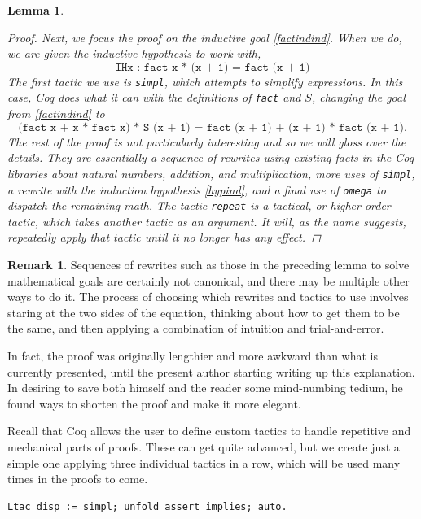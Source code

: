 \documentclass[12pt,notitlepage]{report}
\theoremstyle{plain}
\newtheorem{lem}[theo]{Lemma}
\theoremstyle{definition}
\newtheorem{rem}[theo]{Remark}
\newcommand{\define}[1]{\emph{#1}\index{#1}}
\numberwithin{equation}{section}
\begin{document}
\begin{lem}
\begin{proof}
    \par Next, we focus the proof on the inductive goal \eqref{factindind}.  When we do, we are given the inductive hypothesis to work with,
    \begin{equation}\label{hypind}
\texttt{IHx\ :\ fact\ x * (x + 1) = fact\ (x + 1)}
    \end{equation}
    The first tactic we use is \verb$simpl$, which attempts to simplify expressions.  In this case, Coq does what it can with the definitions of \verb$fact$ and $S$, changing the goal from \eqref{factindind} to
    \begin{equation*}
\texttt{(fact x + x * fact x) * S (x + 1) =
fact (x + 1) + (x + 1) * fact (x + 1)}.
    \end{equation*}
    The rest of the proof is not particularly interesting and so we will gloss over the details.  They are essentially a sequence of rewrites using existing facts in the Coq libraries about natural numbers, addition, and multiplication, more uses of \verb$simpl$, a rewrite with the induction hypothesis \eqref{hypind}, and a final use of \verb$omega$ to dispatch the remaining math.  The tactic \verb$repeat$ is a \define{tactical}, or higher-order tactic, which takes another tactic as an argument.  It will, as the name suggests, repeatedly apply that tactic until it no longer has any effect.
    \end{proof}
\end{lem}
\begin{rem}
Sequences of rewrites such as those in the preceding lemma to solve mathematical goals are certainly not canonical, and there may be multiple other ways to do it.  The process of choosing which rewrites and tactics to use involves staring at the two sides of the equation, thinking about how to get them to be the same, and then applying a combination of intuition and trial-and-error.  
    \par In fact, the proof was originally lengthier and more awkward than what is currently presented, until the present author starting writing up this explanation.  In desiring to save both himself and the reader some mind-numbing tedium, he found ways to shorten the proof and make it more elegant.
    \end{rem}
    
Recall that Coq allows the user to define custom tactics to handle repetitive and mechanical parts of proofs.  These can get quite advanced, but we create just a simple one applying three individual tactics in a row, which will be used many times in the proofs to come.
\begin{verbatim}
Ltac disp := simpl; unfold assert_implies; auto.
\end{verbatim}
\end{document}
